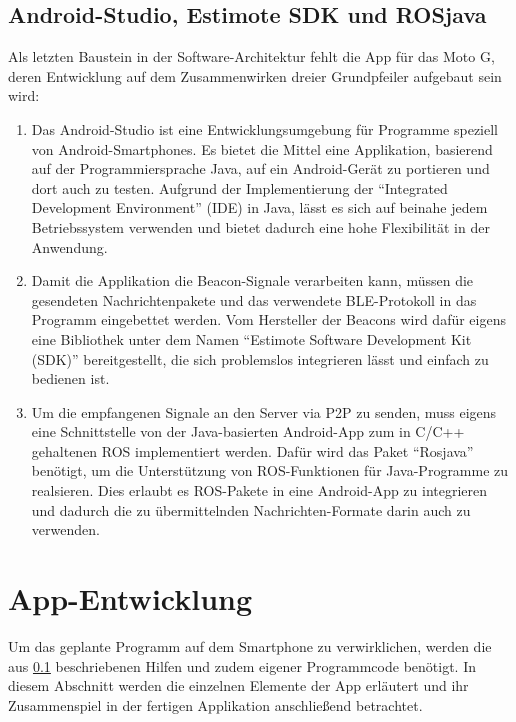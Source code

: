 \subsection{Android-Studio, Estimote SDK und ROSjava}\label{sec:Hilfen}
Als letzten Baustein in der Software-Architektur fehlt die App für das Moto G, deren Entwicklung auf dem Zusammenwirken dreier Grundpfeiler aufgebaut sein wird:
\begin{enumerate}
\item Das Android-Studio \cite{AndStu} ist eine Entwicklungsumgebung für Programme speziell von Android-Smartphones. Es bietet die  Mittel eine Applikation, basierend auf der Programmiersprache Java, auf ein Android-Gerät zu portieren und dort auch zu testen. Aufgrund der Implementierung der "`Integrated Development Environment"' (IDE) in Java, lässt es sich auf beinahe jedem Betriebssystem verwenden und bietet dadurch eine hohe Flexibilität in der Anwendung.
\item Damit die Applikation die Beacon-Signale verarbeiten kann, müssen die gesendeten Nachrichtenpakete und das verwendete BLE-Protokoll in das Programm eingebettet werden. Vom Hersteller der Beacons wird dafür eigens eine Bibliothek unter dem Namen "`Estimote Software Development Kit (SDK)"' \cite{EstSDK} bereitgestellt, die sich problemslos integrieren lässt und einfach zu bedienen ist.
\item Um die empfangenen Signale an den Server via P2P zu senden, muss eigens eine Schnittstelle von der Java-basierten Android-App zum in C/C++ gehaltenen ROS implementiert werden. Dafür wird das Paket "`Rosjava"' \cite{ROSjava} benötigt, um die Unterstützung von ROS-Funktionen für Java-Programme zu realsieren. Dies erlaubt es ROS-Pakete in eine Android-App zu integrieren und dadurch die zu übermittelnden Nachrichten-Formate darin auch zu verwenden.
\end{enumerate}
\section{App-Entwicklung}
Um das geplante Programm auf dem Smartphone zu verwirklichen, werden die aus \ref{sec:Hilfen} beschriebenen Hilfen und zudem eigener Programmcode benötigt. In diesem Abschnitt werden die einzelnen Elemente der App erläutert und ihr Zusammenspiel in der fertigen Applikation anschließend betrachtet. 
